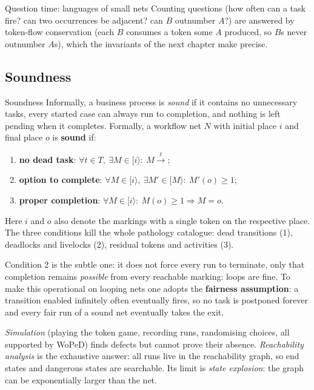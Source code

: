 \begin{examplebox}{Question time: languages of small nets}
Counting questions (how often can a task fire? can two occurrences be adjacent? can $B$ outnumber $A$?) are answered by token-flow conservation (each $B$ consumes a token some $A$ produced, so $B$s never outnumber $A$s), which the invariants of the next chapter make precise.
\end{examplebox}

\subsection{Soundness}

\begin{definitionbox}{Soundness}
Informally, a business process is \emph{sound} if it contains no unnecessary tasks, every started case can always run to completion, and nothing is left pending when it completes. Formally, a workflow net $N$ with initial place $i$ and final place $o$ is \textbf{sound} if:
\begin{enumerate}
  \item \textbf{no dead task}: $\forall t \in T,\ \exists M \in [i\rangle :\ M \xrightarrow{t}$;
  \item \textbf{option to complete}: $\forall M \in [i\rangle,\ \exists M' \in [M\rangle :\ M'(o) \geq 1$;
  \item \textbf{proper completion}: $\forall M \in [i\rangle :\ M(o) \geq 1 \Rightarrow M = o$.
\end{enumerate}
Here $i$ and $o$ also denote the markings with a single token on the respective place. The three conditions kill the whole pathology catalogue: dead transitions (1), deadlocks and livelocks (2), residual tokens and activities (3).
\end{definitionbox}

Condition 2 is the subtle one: it does not force every run to terminate, only that completion remains \emph{possible} from every reachable marking: loops are fine. To make this operational on looping nets one adopts the \textbf{fairness assumption}: a transition enabled infinitely often eventually fires, so no task is postponed forever and every fair run of a sound net eventually takes the exit.

\emph{Simulation} (playing the token game, recording runs, randomising choices, all supported by WoPeD) finds defects but cannot prove their absence. \emph{Reachability analysis} is the exhaustive answer: all runs live in the reachability graph, so end states and dangerous states are searchable. Its limit is \emph{state explosion}: the graph can be exponentially larger than the net.

